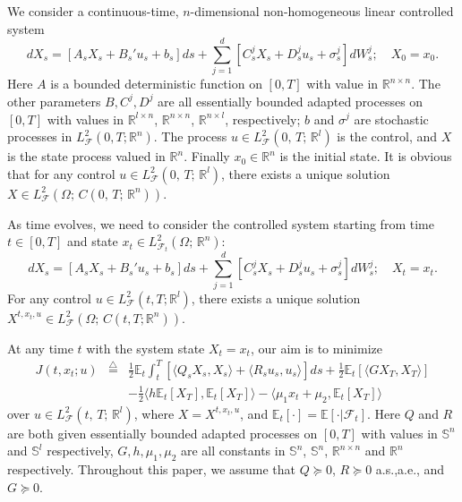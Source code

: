 \documentclass[final]{siamltex}
\begin{document}
We consider  a continuous-time,  $n$-dimensional non-homogeneous linear controlled system
\begin{equation}\label{controlgeneral}
dX_s=[A_sX_s+B_s'u_s+b_s]ds+ \sum_{j=1}^d[C_s^jX_s+D_s^{j} u_s+\sigma_s^{j} ]dW_s^{j};\quad X_0=x_0.
\end{equation}
Here $A$ is a bounded deterministic  function on $[0, T]$ with value in ${\mathbb{R}}^{n\times n}$.
The other parameters $B,C^j,D^j$ are all essentially bounded adapted processes on $[0,T]$
with values in ${\mathbb{R}}^{ l\times n}$,
${\mathbb{R}}^{n\times n}$, ${\mathbb{R}}^{ n\times l}$,  respectively; $b$ and $\sigma^j$ are stochastic processes
in  $L^2_{{\mathcal F}}(0,T; {\mathbb{R}}^n)$.
The process $u\in L^2_{{\mathcal F}}(0, \, T; \, {\mathbb{R}}^l)$ is the control, and
$X$ is the state process valued in ${\mathbb{R}}^n$.
Finally $x_0\in {\mathbb{R}}^n$ is the initial state.
It is obvious that for any control $u\in L^2_{{\mathcal F}}(0, \, T; \, {\mathbb{R}}^l)$, there exists
a unique solution $X\in L^2_{{\mathcal F}}(\Omega; \, C(0, \, T; \, {\mathbb{R}}^n))$.

As time evolves, we need to  consider the controlled system
starting from  time $t\in [0,T]$ and state $x_t\in L^2_{{{\mathcal F}}_t}(\Omega; \, {\mathbb{R}}^n)$:
\begin{equation}\label{controlgeneral:t}
dX_s=[A_sX_s+B_s'u_s+b_s]ds+ \sum_{j=1}^d[C_s^jX_s+D_s^{j} u_s+\sigma_s^{j} ]dW_s^{j};\quad X_t=x_t.
\end{equation}
For any  control $u\in L^2_{{\mathcal F}}(t, T;  {\mathbb{R}}^l)$, there exists
a unique  solution $X^{t,x_t,u}\in L^2_{{\mathcal F}}(\Omega; \, C(t,  T;  {\mathbb{R}}^n))$.

At any time $t$ with the system state $X_t=x_t$, our aim  is to minimize
\begin{eqnarray}\label{costgeneral}
J(t,x_t;u)&{\stackrel{\triangle}{=}}&\frac{1}{2}\mathbb E_t\int_t^T[ {\langle  {Q_sX_s, X_s} \rangle }+{\langle  { R_su_s, u_s} \rangle }]ds+\frac{1}{2}\mathbb E_t [{\langle  {G X_T, X_T} \rangle }]\nonumber \\
&&- \frac{1}{2} {\langle  {h{\mathbb{E}_t\left[{X_T}\right]}, {\mathbb{E}_t\left[{X_T}\right]}} \rangle }-{\langle  { \mu_1 x_t+\mu_2,  {\mathbb{E}_t\left[{X_T}\right]}} \rangle }
\end{eqnarray}
over  $u\in L^2_{{\mathcal F}}(t, \, T; \, {\mathbb{R}}^l)$,
where $X=X^{t,x_t,u}$, and ${\mathbb{E}_t\left[{\cdot}\right]}={\mathbb{E}\left[{\cdot|{{\mathcal F}}_t}\right]}$.
Here $Q$ and $R$ are both given essentially bounded adapted processes on $[0,T]$ with values in ${\mathbb S}^n$
and ${\mathbb S}^l$ respectively,  $G, h, \mu_1, \mu_2$ are all constants in $\mathbb S^n$, $\mathbb S^n$,   ${\mathbb{R}}^{n\times n}$ and ${\mathbb{R}}^n$ respectively.
Throughout this paper, we assume that $Q\succeq 0$, $R\succeq 0$ a.s.,a.e., and $G\succeq 0$.
\end{document}
